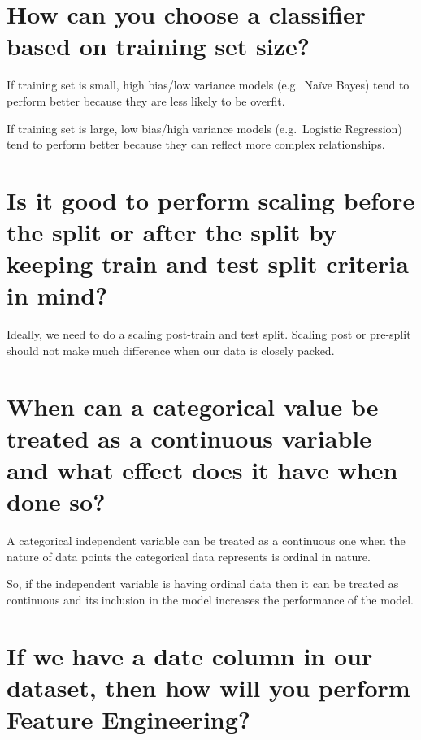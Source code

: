 \documentclass[
]{book}
\begin{document}
\hypertarget{how-can-you-choose-a-classifier-based-on-training-set-size}{%
\section{How can you choose a classifier based on training set size?}\label{how-can-you-choose-a-classifier-based-on-training-set-size}}

If training set is small, high bias/low variance models (e.g.~Naïve Bayes) tend to perform better because they are less likely to be overfit.

If training set is large, low bias/high variance models (e.g.~Logistic Regression) tend to perform better because they can reflect more complex relationships.

\hypertarget{is-it-good-to-perform-scaling-before-the-split-or-after-the-split-by-keeping-train-and-test-split-criteria-in-mind}{%
\section{Is it good to perform scaling before the split or after the split by keeping train and test split criteria in mind?}\label{is-it-good-to-perform-scaling-before-the-split-or-after-the-split-by-keeping-train-and-test-split-criteria-in-mind}}

Ideally, we need to do a scaling post-train and test split. Scaling post or pre-split should not make much difference when our data is closely packed.

\hypertarget{when-can-a-categorical-value-be-treated-as-a-continuous-variable-and-what-effect-does-it-have-when-done-so}{%
\section{When can a categorical value be treated as a continuous variable and what effect does it have when done so?}\label{when-can-a-categorical-value-be-treated-as-a-continuous-variable-and-what-effect-does-it-have-when-done-so}}

A categorical independent variable can be treated as a continuous one when the nature of data points the categorical data represents is ordinal in nature.

So, if the independent variable is having ordinal data then it can be treated as continuous and its inclusion in the model increases the performance of the model.

\hypertarget{if-we-have-a-date-column-in-our-dataset-then-how-will-you-perform-feature-engineering}{%
\section{If we have a date column in our dataset, then how will you perform Feature Engineering?}\label{if-we-have-a-date-column-in-our-dataset-then-how-will-you-perform-feature-engineering}}
\end{document}
